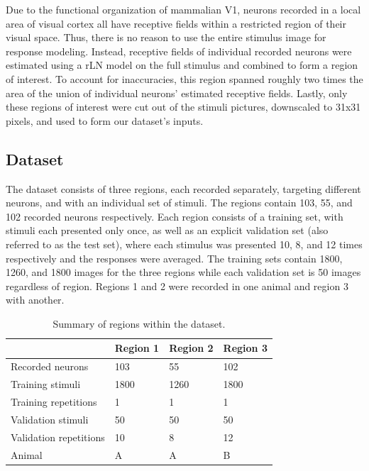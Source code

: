 Due to the functional organization of mammalian V1, neurons recorded in a local area of visual cortex all have receptive fields within a restricted region of their visual space. Thus, there is no reason to use the entire stimulus image for response modeling. Instead, receptive fields of individual recorded neurons were estimated using a rLN model on the full stimulus and combined to form a region of interest. To account for inaccuracies, this region spanned roughly two times the area of the union of individual neurons’ estimated receptive fields. Lastly, only these regions of interest were cut out of the stimuli pictures, downscaled to 31x31 pixels, and used to form our dataset’s inputs.

\subsection{Dataset}\label{ch:4.1.1}

The dataset consists of three regions, each recorded separately, targeting different neurons, and with an individual set of stimuli. The regions contain 103, 55, and 102 recorded neurons respectively. Each region consists of a training set, with stimuli each presented only once, as well as an explicit validation set (also referred to as the test set), where each stimulus was presented 10, 8, and 12 times respectively and the responses were averaged. The training sets contain 1800, 1260, and 1800 images for the three regions while each validation set is 50 images regardless of region. Regions 1 and 2 were recorded in one animal and region 3 with another.

\begin{table}[h]
    \renewcommand{\arraystretch}{1.0}
    \centering
    \begin{tabular}{l|l|l|l}
        \toprule
        & \textbf{Region 1} & \textbf{Region 2} & \textbf{Region 3} \\ \midrule
        Recorded neurons & 103 & 55 & 102 \\ 
        Training stimuli & 1800 & 1260 & 1800 \\ 
        Training repetitions & 1 & 1 & 1 \\ 
        Validation stimuli & 50 & 50 & 50 \\ 
        Validation repetitions & 10 & 8 & 12 \\ 
        Animal & A & A & B \\ \bottomrule

    \end{tabular}
    \caption[Regions of dataset]{Summary of regions within the dataset.}
    \label{tab:4.1}
    \renewcommand{\arraystretch}{1.0}
\end{table}

